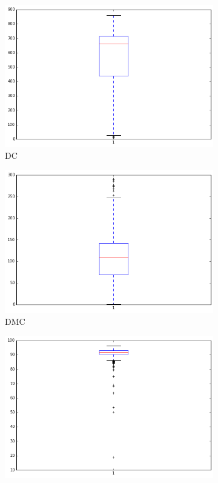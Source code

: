 \begin{figure}[!ht]
\begin{subfigure}[b]{.45\linewidth}
\includegraphics[width=\linewidth]{fig/boxplots/DC.png}
\caption{DC}\label{fig:gull}
\end{subfigure}
\begin{subfigure}[b]{.45\linewidth}
\includegraphics[width=\linewidth]{fig/boxplots/DMC.png}
\caption{DMC}\label{fig:tiger}
\end{subfigure}
\begin{subfigure}[b]{.45\linewidth}
\includegraphics[width=\linewidth]{fig/boxplots/FFMC.png}

\end{subfigure}
\end{figure}
